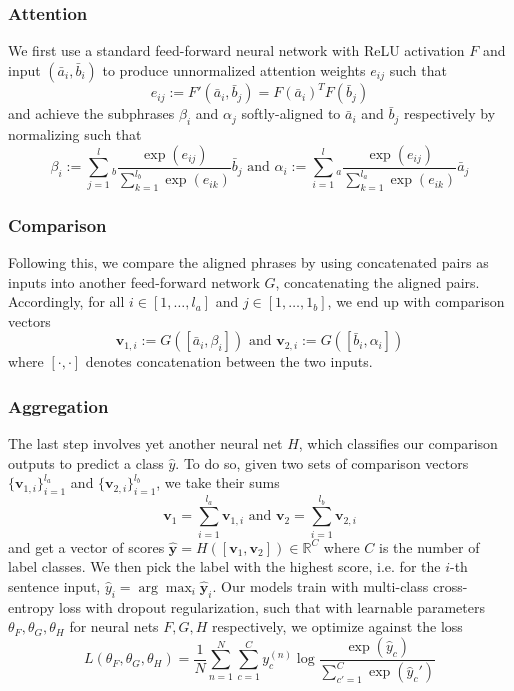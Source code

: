 \documentclass[11pt]{article}
\begin{document}
\subsubsection{Attention}
We first use a standard feed-forward neural network with ReLU activation $F$ and input $(\bar{a}_i, \bar{b}_i)$ to produce unnormalized attention weights $e_{ij}$ such that 
\[
e_{ij} := F'(\bar{a}_i, \bar{b}_j) = F(\bar{a}_i)^T F(\bar{b}_j)
\]
and achieve the subphrases $\beta_i$ and $\alpha_j$ softly-aligned to $\bar{a}_i$ and $\bar{b}_j$ respectively by normalizing such that
\[
\beta_i := \sum_{j=1}^l_b \frac{\exp(e_{ij})}{\sum_{k=1}^{l_b} \exp(e_{ik})} \bar{b}_j
\text{ and }
\alpha_i := \sum_{i=1}^l_a \frac{\exp(e_{ij})}{\sum_{k=1}^{l_a} \exp(e_{ik})} \bar{a}_j
\]

\subsubsection{Comparison}
Following this, we compare the aligned phrases by using concatenated pairs as inputs into another feed-forward network $G$, concatenating the aligned pairs. Accordingly, for all $i \in [1, \ldots, l_a]$ and $j \in [1, \ldots, 1_b]$, we end up with comparison vectors
\[
\textbf{v}_{1,i} := G([\bar{a}_i, \beta_i]) \text{ and } \textbf{v}_{2,i} := G([\bar{b}_i, \alpha_i])
\]
where $[\cdot, \cdot]$ denotes concatenation between the two inputs.

\subsubsection{Aggregation}
The last step involves yet another neural net $H$, which classifies our comparison outputs to predict a class $\hat{y}$. To do so, given two sets of comparison vectors $\{\mathbf{v}_{1, i}\}_{i=1}^{l_a}$ and $\{\mathbf{v}_{2, i}\}_{i=1}^{l_b}$, we take their sums
\[
\mathbf{v}_1 = \sum_{i=1}^{l_a}\mathbf{v}_{1, i} 
\text{ and }
\mathbf{v}_2 = \sum_{i=1}^{l_b}\mathbf{v}_{2, i}
\]
and get a vector of scores $\hat{\mathbf{y}} = H([\mathbf{v}_1, \mathbf{v}_2]) \in \mathbb{R}^C$ where $C$ is the number of label classes. We then pick the label with the highest score, i.e. for the $i$-th sentence input, $\hat{y}_i = \arg \max_i \hat{\mathbf{y}}_i$.
Our models train with multi-class cross-entropy loss with dropout regularization, such that with learnable parameters $\theta_F, \theta_G, \theta_H$ for neural nets $F, G, H$ respectively, we optimize against the loss
\[
L(\theta_F, \theta_G, \theta_H) = \frac{1}{N}\sum_{n=1}^N \sum_{c=1}^C y_c^{(n)}\log \frac{\exp (\hat{y}_c)}{\sum_{c' = 1}^C \exp (\hat{y}_c')}
\]
\end{document}
